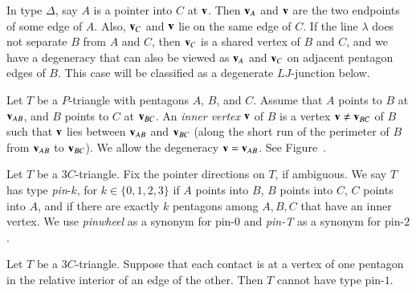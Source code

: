 In type $\Delta$, say $A$ is a pointer into $C$ at ${\mathbf v}$.  Then ${\mathbf v}_A$
and ${\mathbf v}$ are the two endpoints of some edge of $A$.  Also, ${\mathbf v}_C$ and
${\mathbf v}$ lie on the same edge of $C$.  If the line $\lambda$ does not
separate $B$ from $A$ and $C$, then ${\mathbf v}_C$ is a shared vertex of $B$
and $C$, and we have a degeneracy that can also be viewed as ${\mathbf v}_A$
and ${\mathbf v}_C$ on adjacent pentagon edges of $B$.  This case will be
classified as a degenerate $LJ$-junction below.

\begin{definition} Let $T$ be a $P$-triangle with pentagons $A$, $B$,
  and $C$.  Assume that $A$ points to $B$ at ${\mathbf v}_{AB}$, and $B$ points
  to $C$ at ${\mathbf v}_{BC}$.  An {\it inner vertex} ${\mathbf v}$ of $B$ is a vertex
  ${\mathbf v}\ne {\mathbf v}_{BC}$ of $B$ such that ${\mathbf v}$ lies between ${\mathbf v}_{AB}$ and
  ${\mathbf v}_{BC}$ (along the short run of the perimeter of $B$ from
  ${\mathbf v}_{AB}$ to ${\mathbf v}_{BC}$).  We allow the degeneracy ${\mathbf v}={\mathbf v}_{AB}$.
  See Figure~.
\end{definition}

\begin{definition} Let $T$ be a $3C$-triangle.  Fix the pointer
  directions on $T$, if ambiguous. We say $T$ has type {\it pin}-$k$,
  for $k\in \{0,1,2,3\}$ if $A$ points into $B$, $B$ points into $C$,
  $C$ points into $A$, and if there are exactly $k$ pentagons among
  $A,B,C$ that have an inner vertex.  We use {\it pinwheel} as a
  synonym for pin-$0$ and {\it pin-T} as a synonym for pin-$2$.
\end{definition}

\begin{lemma} Let $T$ be a $3C$-triangle. Suppose that each contact is at a vertex of one pentagon in the
  relative interior of an edge of the other. Then $T$ cannot have type pin-$1$.
\end{lemma}


